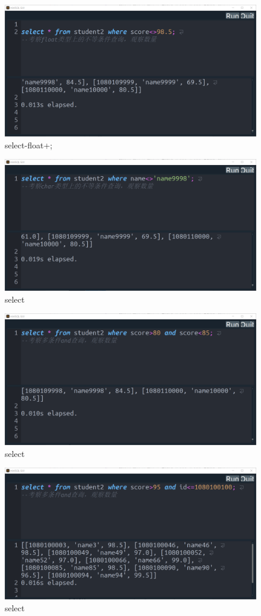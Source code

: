 \documentclass[UTF8]{ctexrep} %
\begin{document}
\begin{figure}[H]
    \centering
    \includegraphics[width=0.8\linewidth]{figure/5.5.png}
    \caption{select-float+;}
    \label{fig:runtime5.5}
\end{figure}
\begin{figure}[H]
    \centering
    \includegraphics[width=0.8\linewidth]{figure/5.6.png}
    \caption{select}
    \label{fig:runtime5.6}
\end{figure}
\begin{figure}[H]
    \centering
    \includegraphics[width=0.8\linewidth]{figure/5.7.png}
    \caption{select}
    \label{fig:runtime5.7}
\end{figure}
\begin{figure}[H]
    \centering
    \includegraphics[width=0.8\linewidth]{figure/5.8.png}
    \caption{select}
    \label{fig:runtime5.8}
\end{figure}
\end{document}
